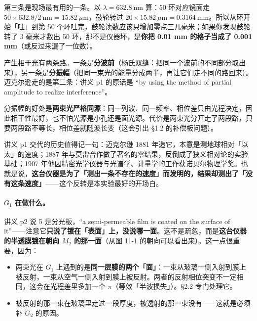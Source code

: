 \documentclass[11pt]{ctexart}
\begin{document}
第三条是现场最有用的一条。以 \(\lambda=632.8\ \mathrm{nm}\) 算：\(50\) 环对应镜面走 \(50\times632.8/2\ \mathrm{nm}=15.82\ \mu\mathrm{m}\)，鼓轮转过 \(20\times15.82\ \mu\mathrm{m}=0.3164\ \mathrm{mm}\)。所以从环开始「吐」到第 50 个环吐完，鼓轮读数应该只增加零点三几毫米；如果你发现鼓轮转了 3 毫米才数出 50 环，那不是仪器坏，是\textbf{你把 0.01 mm 的格子当成了 0.001 mm}（或反过来漏了一位数）。



产生相干光有两条路。一条是\textbf{分波前}（杨氏双缝：把同一个波前的不同部分取出来），另一条是\textbf{分振幅}（把同一束光的能量分成两半，再让它们走不同的路回来）。迈克尔逊走的是第二条：讲义 p1 的原话是 ``by using the method of partial amplitude to realize interference''。

分振幅的好处是\textbf{两束光严格同源}：同一列波、同一频率、相位差只由光程决定，因此相干性最好，也不怕光源是小孔还是面光源。代价是两束光分开走了两段路，只要两段路不等长，相位差就随波长变（这会引出 §1.2 的补偿板问题）。

讲义 p1 交代的历史值得记一句：迈克尔逊 1881 年造它，本意是测地球相对「以太」的速度；1887 年与莫雷合作做了著名的零结果，反倒成了狭义相对论的实验基础；1907 年他因精密光学仪器与光谱学、计量学的工作获诺贝尔物理学奖。也就是说，\textbf{这台仪器是为了「测出一条不存在的速度」而发明的，结果却测出了「没有这条速度」}——这个反转是本实验最好的开场白。


\paragraph{\(G_1\) 在做什么。}讲义 p2 说 5 是分光板，``a semi-permeable film is coated on the surface of it''——注意它\textbf{只说了镀在「表面」上，没说哪一面}。这不是疏忽，而是\textbf{这台仪器的半透膜镀在朝向 \(M_2\) 的那一面}（从图 11-1 的朝向可以看出来）。这一点很重要，因为：

\begin{itemize}
\item 两束光在 \(G_1\) 上遇到的是\textbf{同一层膜的两个「面」}：一束从玻璃一侧入射到膜上被反射，一束从空气一侧入射到膜上被反射。两者的反射相位突变不一定相同，这会在光程差里多加一个 \(\pi\)（等效「半波损失」）。§2.2 专门处理它。
\item 被反射的那一束在玻璃里走过一段厚度，被透射的那一束没有——这就是必须补 \(G_2\) 的原因。
\end{itemize}
\end{document}
